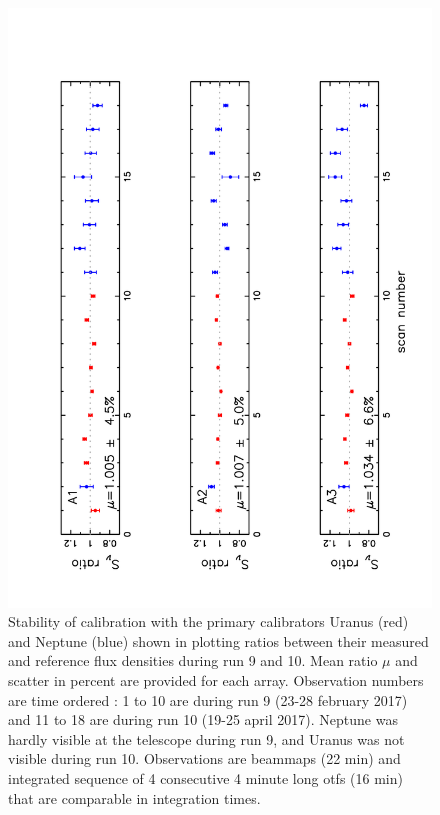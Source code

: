 \begin{figure}[p]
\begin{center}
  \includegraphics[clip, angle=-90, scale=0.6]{Figures/Ura_Nept_r9_10.pdf}
  \caption{Stability of calibration with the primary calibrators
    Uranus (red) and Neptune (blue)  shown in plotting
    ratios between their measured and reference flux densities during run 9 and 10.
    Mean ratio $\mu$ and scatter in percent are provided for each array.
    Observation numbers are time ordered : 1 to 10 are during run 9 (23-28 february 2017) and 11 to 18 are during run 10 (19-25 april 2017).
    Neptune was hardly visible at the telescope during run 9, and Uranus was not visible during run 10.
    Observations are beammaps (22 min) and integrated sequence of 4 consecutive 4 minute long otfs (16 min) that are
    comparable in integration times.}
\label{fig:U_N_ratio}
\end{center}
\end{figure}

